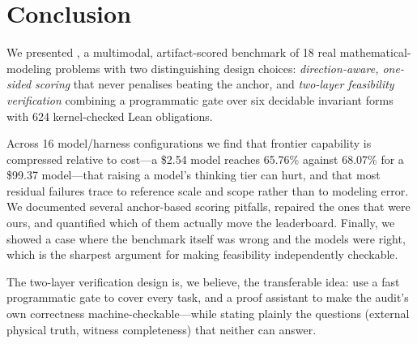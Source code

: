 \section{Conclusion}

We presented \bench{}, a multimodal, artifact-scored benchmark of 18 real mathematical-modeling problems with two distinguishing design choices: \emph{direction-aware, one-sided scoring} that never penalises beating the anchor, and \emph{two-layer feasibility verification} combining a programmatic gate over six decidable invariant forms with 624 kernel-checked Lean obligations.

Across 16 model/harness configurations we find that frontier capability is compressed relative to cost---a \$2.54 model reaches 65.76\% \oeval{} against 68.07\% for a \$99.37 model---that raising a model's thinking tier can hurt, and that most residual failures trace to reference scale and scope rather than to modeling error. We documented several anchor-based scoring pitfalls, repaired the ones that were ours, and quantified which of them actually move the leaderboard. Finally, we showed a case where the benchmark itself was wrong and the models were right, which is the sharpest argument for making feasibility independently checkable.

The two-layer verification design is, we believe, the transferable idea: use a fast programmatic gate to cover every task, and a proof assistant to make the audit's own correctness machine-checkable---while stating plainly the questions (external physical truth, witness completeness) that neither can answer.
